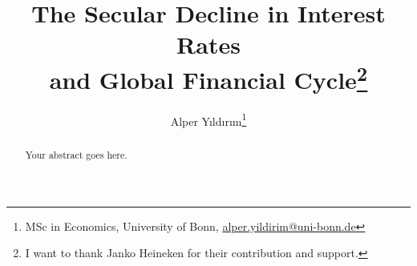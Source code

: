 \begin{titlepage}

\title{The Secular Decline in Interest Rates \\ and Global Financial Cycle\thanks{I want to thank Janko Heineken for their contribution and support.}}
\author{Alper Yıldırım\thanks{MSc in Economics, University of Bonn, \href{mailto:alper.yildirim@uni-bonn.de}{alper.yildirim@uni-bonn.de}}}
\date{} %

\maketitle

\begin{abstract}
Your abstract goes here.
\end{abstract}

\thispagestyle{empty}

\end{titlepage}